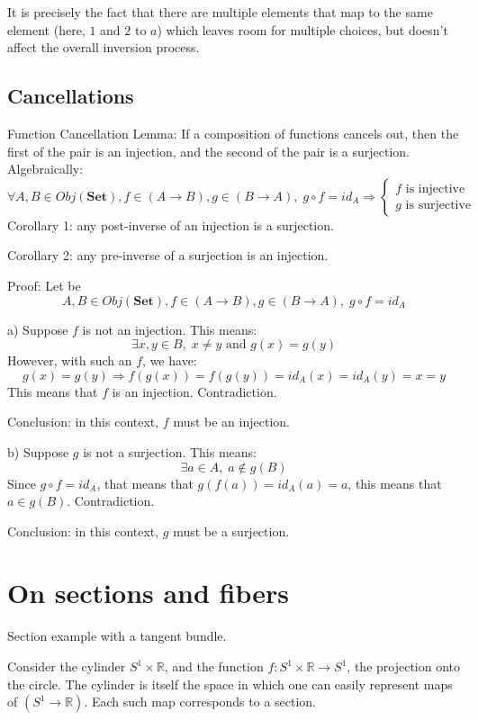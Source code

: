 \documentclass[12pt, letterpaper, twoside]{report}
\begin{document}
It is precisely the fact that there are multiple elements that map to the same element (here, $1$ and $2$ to $a$) which leaves room for multiple choices, but doesn't affect the overall inversion process.



\subsection*{Cancellations}

Function Cancellation Lemma: If a composition of functions cancels out, then the first of the pair is an injection, and the second of the pair is a surjection. Algebraically:
$$
\forall A, B \in Obj(\textbf{Set}),
f \in (A \to B), g \in (B \to A), \;
	g \circ f = id_A
\Rightarrow
	\begin{cases}
		f \text{ is injective} \\
		g \text{ is surjective}
	\end{cases}
$$
Corollary 1: any post-inverse of an injection is a surjection.

Corollary 2: any pre-inverse of a surjection is an injection.

Proof: Let be 
$$A, B \in Obj(\textbf{Set}), f \in (A \to B), g \in (B \to A), \; g \circ f = id_A$$

a) Suppose $f$ is not an injection. This means:
$$\exists x, y \in B, \; x \neq y \text{ and } g(x) = g(y)$$
However, with such an $f$, we have:
$$g(x) = g(y) \Rightarrow f(g(x)) = f(g(y)) = id_A(x) = id_A(y) = x = y$$
This means that $f$ is an injection. Contradiction.

Conclusion: in this context, $f$ must be an injection.

b) Suppose $g$ is not a surjection. This means:
$$\exists a \in A, \; a \notin g(B)$$
Since $g \circ f = id_A$, that means that $g(f(a)) = id_A(a) = a$, this means that $a \in g(B)$. Contradiction.

Conclusion: in this context, $g$ must be a surjection.



\section*{On sections and fibers}

Section example with a tangent bundle.

Consider the cylinder $S^1 \times \mathbb{R}$, and the function $f : S^1 \times \mathbb{R} \to S^1$, the projection onto the circle. The cylinder is itself the space in which one can easily represent maps of $(S^1 \to \mathbb{R})$. Each such map corresponds to a section.
\end{document}
